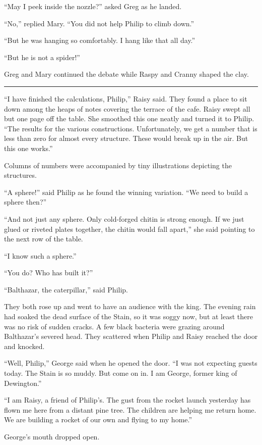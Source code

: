 \documentclass[10pt, draft]{memoir}
\renewcommand{\pfbreakdisplay}{\bigskip \ding{166} \bigskip}
\newcommand{\secbreak}{\fancybreak{\pfbreakdisplay}}
\begin{document}
``May I peek inside the nozzle?'' asked Greg as he landed.

``No,'' replied Mary. ``You did not help Philip to climb down.''

``But he was hanging so comfortably. I hang like that all day.''

``But he is not a spider!''

Greg and Mary continued the debate while Raspy and Cranny shaped the clay.

\secbreak

``I have finished the calculations, Philip,'' Raisy said. They found a place to
sit down among the heaps of notes covering the terrace of the cafe. Raisy swept
all but one page off the table. She smoothed this one neatly and turned it to
Philip. ``The results for the various constructions. Unfortunately, we get a
number that is less than zero for almost every structure. These would break up
in the air. But this one works.''

Columns of numbers were accompanied by tiny illustrations depicting the
structures.

``A sphere!'' said Philip as he found the winning variation. ``We need to build
a sphere then?''

``And not just any sphere. Only cold-forged chitin is strong enough. If we just
glued or riveted plates together, the chitin would fall apart,'' she said
pointing to the next row of the table.

``I know such a sphere.''

``You do? Who has built it?''

``Balthazar, the caterpillar,'' said Philip.

They both rose up and went to have an audience with the king. The evening rain
had soaked the dead surface of the Stain, so it was soggy now, but  at least
there was no risk of sudden cracks. A few black bacteria were grazing around
Balthazar's severed head. They scattered when Philip and Raisy reached the door
and knocked.

``Well, Philip,'' George said when he opened the door. ``I was not expecting
guests today. The Stain is so muddy. But come on in. I am George, former king
of Dewington.''

``I am Raisy, a friend of Philip's. The gust from the rocket launch yesterday
has flown me here from a distant pine tree. The children are helping me return
home. We are building a rocket of our own and flying to my home.''

George's mouth dropped open.
\end{document}
